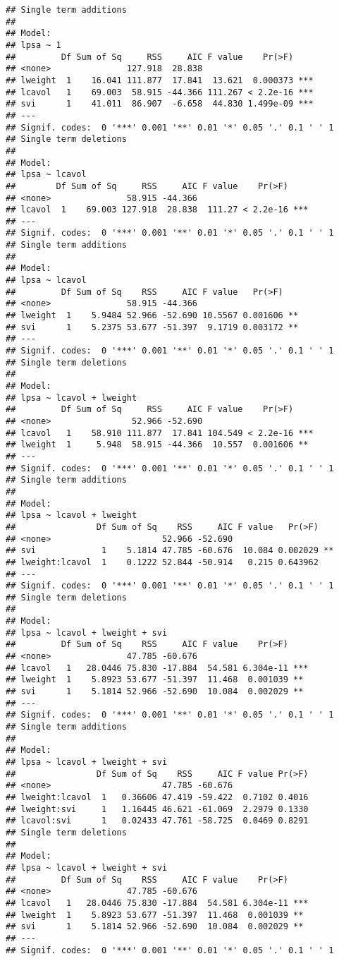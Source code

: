 \documentclass[12pt,dutch,coursenotes]{book}
\theoremstyle{definition}
\theoremstyle{definition}
\theoremstyle{definition}
\theoremstyle{remark}
\begin{document}
\begin{verbatim}
## Single term additions
## 
## Model:
## lpsa ~ 1
##         Df Sum of Sq     RSS     AIC F value    Pr(>F)    
## <none>               127.918  28.838                      
## lweight  1    16.041 111.877  17.841  13.621  0.000373 ***
## lcavol   1    69.003  58.915 -44.366 111.267 < 2.2e-16 ***
## svi      1    41.011  86.907  -6.658  44.830 1.499e-09 ***
## ---
## Signif. codes:  0 '***' 0.001 '**' 0.01 '*' 0.05 '.' 0.1 ' ' 1
## Single term deletions
## 
## Model:
## lpsa ~ lcavol
##        Df Sum of Sq     RSS     AIC F value    Pr(>F)    
## <none>               58.915 -44.366                      
## lcavol  1    69.003 127.918  28.838  111.27 < 2.2e-16 ***
## ---
## Signif. codes:  0 '***' 0.001 '**' 0.01 '*' 0.05 '.' 0.1 ' ' 1
## Single term additions
## 
## Model:
## lpsa ~ lcavol
##         Df Sum of Sq    RSS     AIC F value   Pr(>F)   
## <none>               58.915 -44.366                    
## lweight  1    5.9484 52.966 -52.690 10.5567 0.001606 **
## svi      1    5.2375 53.677 -51.397  9.1719 0.003172 **
## ---
## Signif. codes:  0 '***' 0.001 '**' 0.01 '*' 0.05 '.' 0.1 ' ' 1
## Single term deletions
## 
## Model:
## lpsa ~ lcavol + lweight
##         Df Sum of Sq     RSS     AIC F value    Pr(>F)    
## <none>                52.966 -52.690                      
## lcavol   1    58.910 111.877  17.841 104.549 < 2.2e-16 ***
## lweight  1     5.948  58.915 -44.366  10.557  0.001606 ** 
## ---
## Signif. codes:  0 '***' 0.001 '**' 0.01 '*' 0.05 '.' 0.1 ' ' 1
## Single term additions
## 
## Model:
## lpsa ~ lcavol + lweight
##                Df Sum of Sq    RSS     AIC F value   Pr(>F)   
## <none>                      52.966 -52.690                    
## svi             1    5.1814 47.785 -60.676  10.084 0.002029 **
## lweight:lcavol  1    0.1222 52.844 -50.914   0.215 0.643962   
## ---
## Signif. codes:  0 '***' 0.001 '**' 0.01 '*' 0.05 '.' 0.1 ' ' 1
## Single term deletions
## 
## Model:
## lpsa ~ lcavol + lweight + svi
##         Df Sum of Sq    RSS     AIC F value    Pr(>F)    
## <none>               47.785 -60.676                      
## lcavol   1   28.0446 75.830 -17.884  54.581 6.304e-11 ***
## lweight  1    5.8923 53.677 -51.397  11.468  0.001039 ** 
## svi      1    5.1814 52.966 -52.690  10.084  0.002029 ** 
## ---
## Signif. codes:  0 '***' 0.001 '**' 0.01 '*' 0.05 '.' 0.1 ' ' 1
## Single term additions
## 
## Model:
## lpsa ~ lcavol + lweight + svi
##                Df Sum of Sq    RSS     AIC F value Pr(>F)
## <none>                      47.785 -60.676               
## lweight:lcavol  1   0.36606 47.419 -59.422  0.7102 0.4016
## lweight:svi     1   1.16445 46.621 -61.069  2.2979 0.1330
## lcavol:svi      1   0.02433 47.761 -58.725  0.0469 0.8291
## Single term deletions
## 
## Model:
## lpsa ~ lcavol + lweight + svi
##         Df Sum of Sq    RSS     AIC F value    Pr(>F)    
## <none>               47.785 -60.676                      
## lcavol   1   28.0446 75.830 -17.884  54.581 6.304e-11 ***
## lweight  1    5.8923 53.677 -51.397  11.468  0.001039 ** 
## svi      1    5.1814 52.966 -52.690  10.084  0.002029 ** 
## ---
## Signif. codes:  0 '***' 0.001 '**' 0.01 '*' 0.05 '.' 0.1 ' ' 1
\end{verbatim}
\end{document}
